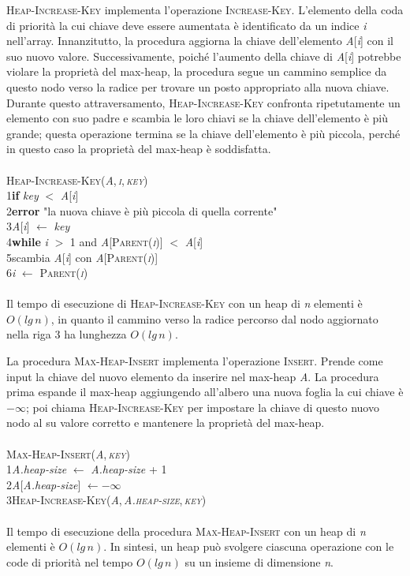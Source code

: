 \documentclass[10pt, a4paper]{report}
\newcommand\firsttab[1][0.5cm]{\hspace*{#1}}
\newcommand\secondtab[1][1cm]{\hspace*{#1}}
\begin{document}
\textsc{Heap-Increase-Key} implementa l'operazione \textsc{Increase-Key}. L'elemento della coda di priorità la cui chiave deve essere aumentata è identificato da un indice \textit{i} nell'array. Innanzitutto, la procedura aggiorna la chiave dell'elemento \textit{A}[\textit{i}] con il suo nuovo valore. Successivamente, poiché l'aumento della chiave di \textit{A}[\textit{i}] potrebbe violare la proprietà del max-heap, la procedura segue un cammino semplice da questo nodo verso la radice per trovare un posto appropriato alla nuova chiave. Durante questo attraversamento, \textsc{Heap-Increase-Key} confronta ripetutamente un elemento con suo padre e scambia le loro chiavi se la chiave dell'elemento è più grande; questa operazione termina se la chiave dell'elemento è più piccola, perché in questo caso la proprietà del max-heap è soddisfatta.\\\\
\textsc{Heap-Increase-Key(\textit{A},\,\textit{i},\,\textit{key})}\\
1\firsttab\textbf{if} \textit{key} $<$ \textit{A}[\textit{i}]\\
2\secondtab\textbf{error} "la nuova chiave è più piccola di quella corrente"\\
3\firsttab\textit{A}[\textit{i}] $\leftarrow$ \textit{key}\\
4\firsttab\textbf{while} \textit{i} $>$ 1 and \textit{A}[\textsc{Parent(\textit{i})}] $<$ \textit{A}[\textit{i}]\\
5\secondtab scambia \textit{A}[\textit{i}] con \textit{A}[\textsc{Parent(\textit{i})}]\\
6\secondtab\textit{i} $\leftarrow$ \textsc{Parent(\textit{i})}\\\\
Il tempo di esecuzione di \textsc{Heap-Increase-Key} con un heap di \textit{n} elementi è $O(lg\,n)$, in quanto il cammino verso la radice percorso dal nodo aggiornato nella riga 3 ha lunghezza $O(lg\,n)$.

La procedura \textsc{Max-Heap-Insert} implementa l'operazione \textsc{Insert}. Prende come input la chiave del nuovo elemento da inserire nel max-heap \textit{A}. La procedura prima espande il max-heap aggiungendo all'albero una nuova foglia la cui chiave è $-\infty$; poi chiama \textsc{Heap-Increase-Key} per impostare la chiave di questo nuovo nodo al su valore corretto e mantenere la proprietà del max-heap.\\\\
\textsc{Max-Heap-Insert(\textit{A},\,\textit{key})}\\
1\firsttab\textit{A.heap-size} $\leftarrow$ \textit{A.heap-size} + 1\\
2\firsttab\textit{A}[\textit{A.heap-size}] $\leftarrow -\infty$\\
3\firsttab\textsc{Heap-Increase-Key(\textit{A},\,\textit{A.heap-size},\,\textit{key})}\\\\
Il tempo di esecuzione della procedura \textsc{Max-Heap-Insert} con un heap di \textit{n} elementi è $O(lg\,n)$. In sintesi, un heap può svolgere ciascuna operazione con le code di priorità nel tempo $O(lg\,n)$ su un insieme di dimensione \textit{n}.
\end{document}
